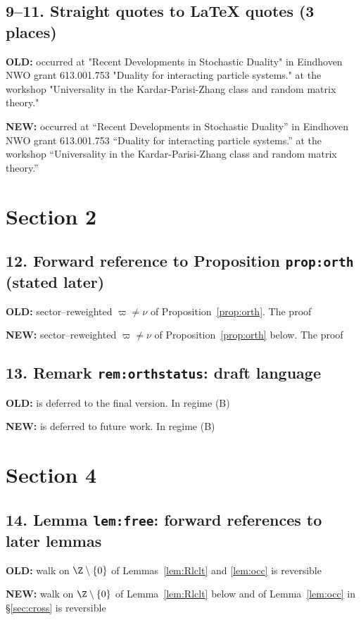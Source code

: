 \documentclass[11pt]{article}
\newenvironment{old}{\par\noindent\textcolor{oldred}{\textbf{OLD:}}\small\color{oldred}\verbatim}{\endverbatim\normalsize\color{black}}
\newenvironment{new}{\par\noindent\textcolor{newgreen}{\textbf{NEW:}}\small\color{newgreen}\verbatim}{\endverbatim\normalsize\color{black}}
\begin{document}
\subsection*{9--11. Straight quotes to LaTeX quotes (3 places)}
\begin{old}
occurred at "Recent Developments in Stochastic Duality" in Eindhoven
NWO grant 613.001.753 "Duality for interacting particle systems."
at the workshop "Universality in the Kardar-Parisi-Zhang class and random
matrix theory."
\end{old}
\begin{new}
occurred at ``Recent Developments in Stochastic Duality'' in Eindhoven
NWO grant 613.001.753 ``Duality for interacting particle systems.''
at the workshop ``Universality in the Kardar-Parisi-Zhang class and random
matrix theory.''
\end{new}

\section*{Section 2}

\subsection*{12. Forward reference to Proposition \texttt{prop:orth} (stated later)}
\begin{old}
sector--reweighted $\varpi\ne\nu$ of Proposition~\ref{prop:orth}. The proof
\end{old}
\begin{new}
sector--reweighted $\varpi\ne\nu$ of Proposition~\ref{prop:orth} below. The proof
\end{new}

\subsection*{13. Remark \texttt{rem:orthstatus}: draft language}
\begin{old}
is deferred to the final version. In regime (B)
\end{old}
\begin{new}
is deferred to future work. In regime (B)
\end{new}

\section*{Section 4}

\subsection*{14. Lemma \texttt{lem:free}: forward references to later lemmas}
\begin{old}
walk on $\Z\setminus\{0\}$ of Lemmas~\ref{lem:Rlclt} and \ref{lem:occ} is
reversible
\end{old}
\begin{new}
walk on $\Z\setminus\{0\}$ of Lemma~\ref{lem:Rlclt} below and of
Lemma~\ref{lem:occ} in \S\ref{sec:cross} is reversible
\end{new}
\end{document}

